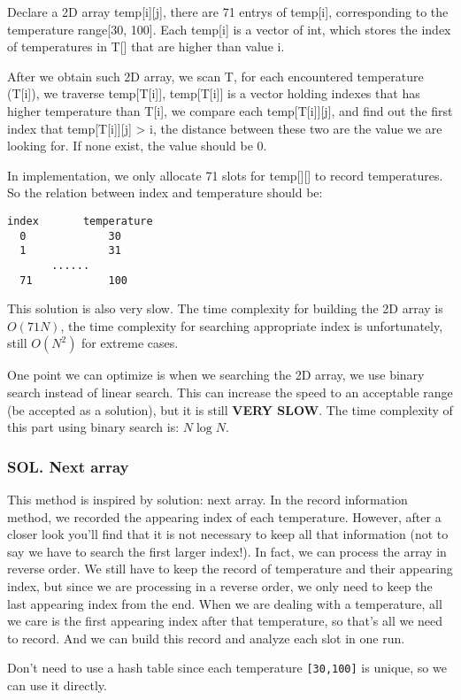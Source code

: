 \documentclass[12pt]{article}
\begin{document}
Declare a 2D array temp[i][j], there are 71 entrys of temp[i], corresponding to the temperature range[30, 100]. Each temp[i] is a vector of int, which stores the index of temperatures in T[] that are higher than value i.

After we obtain such 2D array, we scan T, for each encountered temperature (T[i]), we traverse temp[T[i]], temp[T[i]] is a vector holding indexes that has higher temperature than T[i], we compare each temp[T[i]][j], and find out the first index that temp[T[i]][j] > i, the distance between these two are the value we are looking for. If none exist, the value should be 0.

In implementation, we only allocate 71 slots for temp[][] to record temperatures. So the relation between index and temperature should be:
\begin{verbatim}
index       temperature
  0             30
  1             31
       ......
  71            100  
\end{verbatim}

This solution is also very slow. The time complexity for building the 2D array is \(O(71N)\), the time complexity for searching appropriate index is unfortunately, still \(O(N^2)\) for extreme cases.

One point we can optimize is when we searching the 2D array, we use binary search instead of linear search. This can increase the speed to an acceptable range (be accepted as a solution), but it is still \textbf{VERY SLOW}. The time complexity of this part using binary search is: \(N\log{N}\).
\subsubsection{SOL. Next array}
\label{sec:org5c7eb7c}
This method is inspired by solution: next array. In the record information method, we recorded the appearing index of each temperature. However, after a closer look you'll find that it is not necessary to keep all that information (not to say we have to search the first larger index!). In fact, we can process the array in reverse order. We still have to keep the record of temperature and their appearing index, but since we are processing in a reverse order, we only need to keep the last appearing index from the end. When we are dealing with a temperature, all we care is the first appearing index after that temperature, so that's all we need to record. And we can build this record and analyze each slot in one run.

Don't need to use a hash table since each temperature \texttt{[30,100]} is unique, so we can use it directly.
\end{document}
